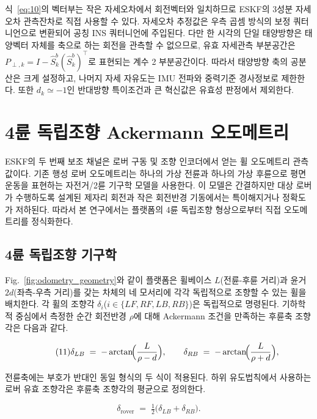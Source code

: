 \documentclass[]{IAC_style}
\begin{document}
식~\eqref{eq:10}의 벡터부는 작은 자세오차에서 회전벡터와 일치하므로 ESKF의 3성분 자세오차 관측잔차로 직접 사용할 수 있다. 자세오차 추정값은 우측 곱셈 방식의 보정 쿼터니언으로 변환되어 공칭 INS 쿼터니언에 주입된다. 다만 한 시각의 단일 태양방향은 태양벡터 자체를 축으로 하는 회전을 관측할 수 없으므로, 유효 자세관측 부분공간은 $P_{\perp,k}=I-\hat S_k^b(\hat S_k^b)^\top$로 표현되는 계수 2 부분공간이다. 따라서 태양방향 축의 공분산은 크게 설정하고, 나머지 자세 자유도는 IMU 전파와 중력기준 경사정보로 제한한다. 또한 $d_k\simeq-1$인 반대방향 특이조건과 큰 혁신값은 유효성 판정에서 제외한다.

\section{4륜 독립조향 Ackermann 오도메트리}

ESKF의 두 번째 보조 채널은 로버 구동 및 조향 인코더에서 얻는 휠 오도메트리 관측값이다. 기존 행성 로버 오도메트리는 하나의 가상 전륜과 하나의 가상 후륜으로 평면운동을 표현하는 자전거/2륜 기구학 모델을 사용한다. 이 모델은 간결하지만 대상 로버가 수행하도록 설계된 제자리 회전과 작은 회전반경 기동에서는 특이해지거나 정확도가 저하된다. 따라서 본 연구에서는 플랫폼의 4륜 독립조향 형상으로부터 직접 오도메트리를 정식화한다.

\subsection{4륜 독립조향 기구학}

Fig.~\ref{fig:odometry_geometry}와 같이 플랫폼은 휠베이스 $L$(전륜-후륜 거리)과 윤거 $2d$(좌측-우측 거리)를 갖는 차체의 네 모서리에 각각 독립적으로 조향할 수 있는 휠을 배치한다. 각 휠의 조향각 $\delta_i$($i \in \{LF, RF, LB, RB\}$)은 독립적으로 명령된다. 기하학적 중심에서 측정한 순간 회전반경 $\rho$에 대해 Ackermann 조건을 만족하는 후륜축 조향각은 다음과 같다.

\begin{equation}
\tag{11}\label{eq:11}
\delta_{LB} \;=\; -\arctan\!\Bigl(\dfrac{L}{\rho - d}\Bigr), \qquad \delta_{RB} \;=\; -\arctan\!\Bigl(\dfrac{L}{\rho + d}\Bigr),
\end{equation}

전륜축에는 부호가 반대인 동일 형식의 두 식이 적용된다. 하위 유도법칙에서 사용하는 로버 유효 조향각은 후륜축 조향각의 평균으로 정의한다.

\begin{equation}
\tag{12}\label{eq:12}
\delta_{\mathrm{rover}} \;=\; \tfrac{1}{2}\bigl(\delta_{LB} + \delta_{RB}\bigr).
\end{equation}
\end{document}
